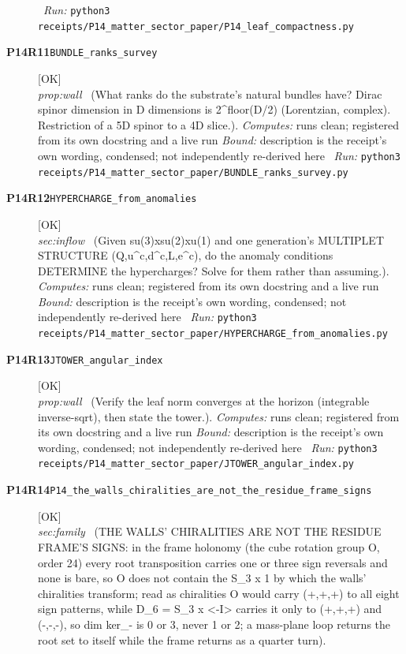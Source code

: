 \begin{description}
\ \emph{Run:} \texttt{python3 receipts/P14\_matter\_sector\_paper/P14\_leaf\_compactness.py}
\item[\rcptlabel{BUNDLE_ranks_survey}{P14R11}\textbf{P14R11}\quad\texttt{BUNDLE\_ranks\_survey}]\hfill\textsf{[OK]}\\
\textit{prop:wall} \ (What ranks do the substrate's natural bundles have? Dirac spinor dimension in D dimensions is 2\textasciicircum{}floor(D/2) (Lorentzian, complex). Restriction of a 5D spinor to a 4D slice.). 
\emph{Computes:} runs clean; registered from its own docstring and a live run
 \emph{Bound:} description is the receipt's own wording, condensed; not independently re-derived here
\ \emph{Run:} \texttt{python3 receipts/P14\_matter\_sector\_paper/BUNDLE\_ranks\_survey.py}
\item[\rcptlabel{HYPERCHARGE_from_anomalies}{P14R12}\textbf{P14R12}\quad\texttt{HYPERCHARGE\_from\_anomalies}]\hfill\textsf{[OK]}\\
\textit{sec:inflow} \ (Given su(3)xsu(2)xu(1) and one generation's MULTIPLET STRUCTURE (Q,u\textasciicircum{}c,d\textasciicircum{}c,L,e\textasciicircum{}c), do the anomaly conditions DETERMINE the hypercharges? Solve for them rather than assuming.). 
\emph{Computes:} runs clean; registered from its own docstring and a live run
 \emph{Bound:} description is the receipt's own wording, condensed; not independently re-derived here
\ \emph{Run:} \texttt{python3 receipts/P14\_matter\_sector\_paper/HYPERCHARGE\_from\_anomalies.py}
\item[\rcptlabel{JTOWER_angular_index}{P14R13}\textbf{P14R13}\quad\texttt{JTOWER\_angular\_index}]\hfill\textsf{[OK]}\\
\textit{prop:wall} \ (Verify the leaf norm converges at the horizon (integrable inverse-sqrt), then state the tower.). 
\emph{Computes:} runs clean; registered from its own docstring and a live run
 \emph{Bound:} description is the receipt's own wording, condensed; not independently re-derived here
\ \emph{Run:} \texttt{python3 receipts/P14\_matter\_sector\_paper/JTOWER\_angular\_index.py}
\item[\rcptlabel{P14_the_walls_chiralities_are_not_the_residue_frame_signs}{P14R14}\textbf{P14R14}\quad\texttt{P14\_the\_walls\_chiralities\_are\_not\_the\_residue\_frame\_signs}]\hfill\textsf{[OK]}\\
\textit{sec:family} \ (THE WALLS' CHIRALITIES ARE NOT THE RESIDUE FRAME'S SIGNS: in the frame holonomy (the cube rotation group O, order 24) every root transposition carries one or three sign reversals and none is bare, so O does not contain the S\_3 x 1 by which the walls' chiralities transform; read as chiralities O would carry (+,+,+) to all eight sign patterns, while D\_6 = S\_3 x <-I> carries it only to (+,+,+) and (-,-,-), so dim ker\_- is 0 or 3, never 1 or 2; a mass-plane loop returns the root set to itself while the frame returns as a quarter turn). 

\end{description}
